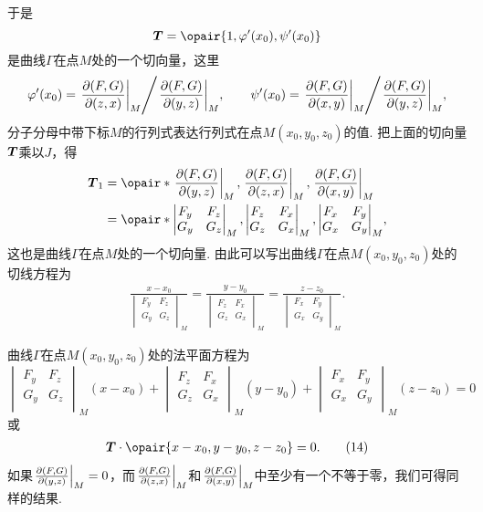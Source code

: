 于是\[
\mat{T} = \opair{1,\varphi'(x_0),\psi'(x_0)}
\]是曲线\(\Gamma\)在点\(M\)处的一个切向量，这里\[
\varphi'(x_0) = {\eval{\jacobi{F,G}{z,x}}_M}\Bigg/{\eval{\jacobi{F,G}{y,z}}_M},
\qquad
\psi'(x_0) = {\eval{\jacobi{F,G}{x,y}}_M}\Bigg/{\eval{\jacobi{F,G}{y,z}}_M},
\]分子分母中带下标\(M\)的行列式表达行列式在点\(M(x_0,y_0,z_0)\)的值.
把上面的切向量\(\boldsymbol{T}\)乘以\(J\)，得\begin{align*}
\mat{T}_1 &= \opair*{
 \eval{\jacobi{F,G}{y,z}}_M,
 \eval{\jacobi{F,G}{z,x}}_M,
 \eval{\jacobi{F,G}{x,y}}_M
} \\
&= \opair*{
\begin{vmatrix}
F_y & F_z \\
G_y & G_z \\
\end{vmatrix}_M,
\begin{vmatrix}
F_z & F_x \\
G_z & G_x \\
\end{vmatrix}_M,
\begin{vmatrix}
F_x & F_y \\
G_x & G_y \\
\end{vmatrix}_M
},
\end{align*}
这也是曲线\(\Gamma\)在点\(M\)处的一个切向量.
由此可以写出曲线\(\Gamma\)在点\(M(x_0,y_0,z_0)\)处的切线方程为\begin{gather}
\frac{x-x_0}{\begin{vmatrix}
F_y & F_z \\
G_y & G_z \\
\end{vmatrix}_M}
=\frac{y-y_0}{\begin{vmatrix}
F_z & F_x \\
G_z & G_x \\
\end{vmatrix}_M}
=\frac{z-z_0}{\begin{vmatrix}
F_x & F_y \\
G_x & G_y \\
\end{vmatrix}_M}.
\tag{13}
\end{gather}

曲线\(\Gamma\)在点\(M(x_0,y_0,z_0)\)处的法平面方程为\[
\begin{vmatrix}
F_y & F_z \\
G_y & G_z \\
\end{vmatrix}_M
(x-x_0)
+ \begin{vmatrix}
F_z & F_x \\
G_z & G_x \\
\end{vmatrix}_M
(y-y_0)
+ \begin{vmatrix}
F_x & F_y \\
G_x & G_y \\
\end{vmatrix}_M
(z-z_0) = 0
\]或\begin{gather}
\mat{T}\cdot\opair{x-x_0,y-y_0,z-z_0}=0.
\tag{14}
\end{gather}
如果\(\eval{\jacobi{F,G}{y,z}}_M = 0\)，而\(\eval{\jacobi{F,G}{z,x}}_M\)和\(\eval{\jacobi{F,G}{x,y}}_M\)中至少有一个不等于零，我们可得同样的结果.

